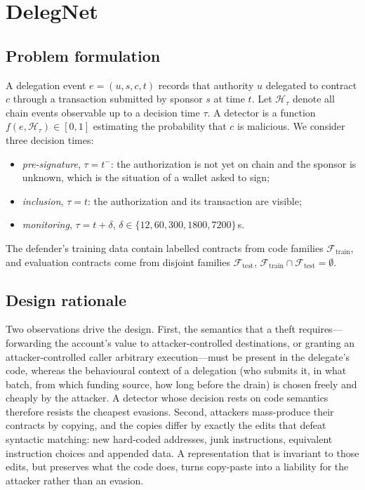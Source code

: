 \section{DelegNet}
\label{sec:method}

\subsection{Problem formulation}
A delegation event $e=(u,s,c,t)$ records that authority $u$ delegated to contract $c$ through a transaction submitted by sponsor $s$ at time $t$. Let $\mathcal{H}_{\tau}$ denote all chain events observable up to a decision time $\tau$. A detector is a function $f(e,\mathcal{H}_{\tau}) \in [0,1]$ estimating the probability that $c$ is malicious. We consider three decision times:
\begin{itemize}
\item \emph{pre-signature}, $\tau=t^-$: the authorization is not yet on chain and the sponsor is unknown, which is the situation of a wallet asked to sign;
\item \emph{inclusion}, $\tau=t$: the authorization and its transaction are visible;
\item \emph{monitoring}, $\tau=t+\delta$, $\delta\in\{12,60,300,1800,7200\}$\,s.
\end{itemize}
The defender's training data contain labelled contracts from code families $\mathcal{F}_{\mathrm{train}}$, and evaluation contracts come from disjoint families $\mathcal{F}_{\mathrm{test}}$, $\mathcal{F}_{\mathrm{train}}\cap\mathcal{F}_{\mathrm{test}}=\emptyset$.

\subsection{Design rationale}
Two observations drive the design. First, the semantics that a theft requires---forwarding the account's value to attacker-controlled destinations, or granting an attacker-controlled caller arbitrary execution---must be present in the delegate's code, whereas the behavioural context of a delegation (who submits it, in what batch, from which funding source, how long before the drain) is chosen freely and cheaply by the attacker. A detector whose decision rests on code semantics therefore resists the cheapest evasions. Second, attackers mass-produce their contracts by copying, and the copies differ by exactly the edits that defeat syntactic matching: new hard-coded addresses, junk instructions, equivalent instruction choices and appended data. A representation that is invariant to those edits, but preserves what the code does, turns copy-paste into a liability for the attacker rather than an evasion.

